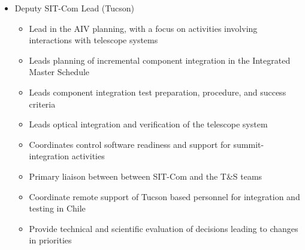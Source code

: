 \documentclass[SE,lsstdraft,authoryear,toc]{lsstdoc, lsstdraft}
\begin{document}
\begin{itemize}
\begin{itemize}
    \end{itemize}
\item Deputy SIT-Com Lead (Tucson)
    \begin{itemize}
        \item Lead in the AIV planning, with a focus on activities involving interactions with telescope systems
        \item Leads planning of incremental component integration in the Integrated Master Schedule
        \item Leads component integration test preparation, procedure, and success criteria
        \item Leads optical integration and verification of the telescope system
        \item Coordinates control software readiness and support for summit-integration activities
        \item Primary liaison between between SIT-Com and the T\&S teams
        \item Coordinate remote support of Tucson based personnel for integration and testing in Chile
        \item Provide technical and scientific evaluation of decisions leading to changes in priorities
    \end{itemize}
\end{itemize}
\end{document}
